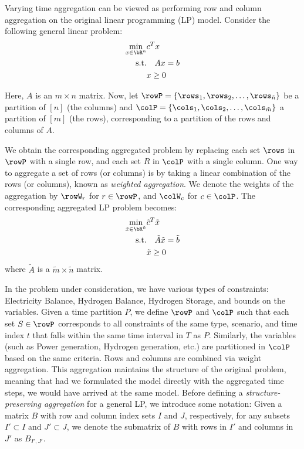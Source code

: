 {\color{violet}
Varying time aggregation can be viewed as performing row and column aggregation on the original linear programming (LP) model. Consider the following general linear problem:
\begin{align}
\label{eq:LP}
\min_{x \in \bR^{n}} &c^T x \\ 
\text{s.t.} &\quad Ax = b \\
&x \geq 0
\end{align}

Here, \(A\) is an \(m \times n\) matrix. Now, let \(\rowP = \{\rows_1, \rows_2, \ldots, \rows_{\tilde{n}}\}\) be a partition of \([n]\) (the columns) and \(\colP = \{\cols_1, \cols_2, \ldots, \cols_{\tilde{m}}\}\) a partition of \([m]\) (the rows), corresponding to a partition of the rows and columns of \(A\).

We obtain the corresponding aggregated problem by replacing each set \(\rows\) in \(\rowP\) with a single row, and each set \(R\) in \(\colP\) with a single column. 
One way to aggregate a set of rows (or columns) is by taking a linear combination of the rows (or columns), known as \emph{weighted aggregation}.
We denote the weights of the aggregation by \(\rowW_r\) for \(r \in \rowP\), and \(\colW_c\) for \(c \in \colP\).
The corresponding aggregated LP problem becomes:
\begin{align}
\label{eq:LPaggr}
\min_{\tilde{x} \in \bR^{\tilde{n}}} &\tilde{c}^T \tilde{x} \\ 
\text{s.t.} &\quad \tilde{A} \tilde{x} = \tilde{b} \\ 
&\tilde{x} \geq 0 
\end{align}
where \(\tilde{A}\) is a \(\tilde{m}\times \tilde{n}\) matrix.

In the problem under consideration, we have various types of constraints: Electricity Balance, Hydrogen Balance, Hydrogen Storage, and bounds on the variables. Given a time partition \(P\), we define \(\rowP\) and \(\colP\) such that each set \(S \in \rowP\) corresponds to all constraints of the same type, scenario, and time index \(t\) that falls within the same time interval in \(T\) as \(P\). Similarly, the variables (such as Power generation, Hydrogen generation, etc.) are partitioned in \(\colP\) based on the same criteria.
 Rows and columns are combined via weight aggregation. This aggregation maintains the structure of the original problem, 
meaning that had we formulated the model directly with the aggregated time steps, we would have arrived at the same model.
Before defining a \emph{structure-preserving aggregation} for a general LP, we introduce some notation: 
Given a matrix \(B\) with row and column index sets \(I\) and \(J\), respectively, for any subsets \(I' \subset I\) and \(J' \subset J\), 
we denote the submatrix of \(B\) with rows in \(I'\) and columns in \(J'\) as \(B_{I',J'}\).

}
